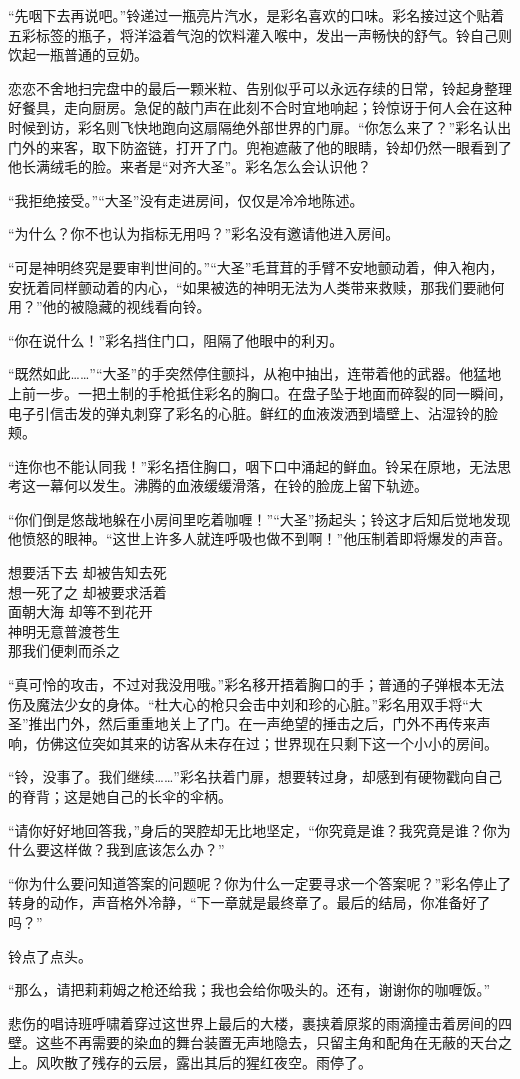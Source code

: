 “先咽下去再说吧。”铃递过一瓶亮片汽水，是彩名喜欢的口味。彩名接过这个贴着五彩标签的瓶子，将洋溢着气泡的饮料灌入喉中，发出一声畅快的舒气。铃自己则饮起一瓶普通的豆奶。

恋恋不舍地扫完盘中的最后一颗米粒、告别似乎可以永远存续的日常，铃起身整理好餐具，走向厨房。急促的敲门声在此刻不合时宜地响起；铃惊讶于何人会在这种时候到访，彩名则飞快地跑向这扇隔绝外部世界的门扉。“你怎么来了？”彩名认出门外的来客，取下防盗链，打开了门。兜袍遮蔽了他的眼睛，铃却仍然一眼看到了他长满绒毛的脸。来者是“对齐大圣”。彩名怎么会认识他？

“我拒绝接受。”“大圣”没有走进房间，仅仅是冷冷地陈述。

“为什么？你不也认为指标无用吗？”彩名没有邀请他进入房间。

“可是神明终究是要审判世间的。”“大圣”毛茸茸的手臂不安地颤动着，伸入袍内，安抚着同样颤动着的内心，“如果被选的神明无法为人类带来救赎，那我们要祂何用？”他的被隐藏的视线看向铃。

“你在说什么！”彩名挡住门口，阻隔了他眼中的利刃。

“既然如此……”“大圣”的手突然停住颤抖，从袍中抽出，连带着他的武器。他猛地上前一步。一把土制的手枪抵住彩名的胸口。在盘子坠于地面而碎裂的同一瞬间，电子引信击发的弹丸刺穿了彩名的心脏。鲜红的血液泼洒到墙壁上、沾湿铃的脸颊。

“连你也不能认同我！”彩名捂住胸口，咽下口中涌起的鲜血。铃呆在原地，无法思考这一幕何以发生。沸腾的血液缓缓滑落，在铃的脸庞上留下轨迹。

“你们倒是悠哉地躲在小房间里吃着咖喱！”“大圣”扬起头；铃这才后知后觉地发现他愤怒的眼神。“这世上许多人就连呼吸也做不到啊！”他压制着即将爆发的声音。
\begin{song}
想要活下去 却被告知去死\\
想一死了之 却被要求活着\\
面朝大海 却等不到花开\\
神明无意普渡苍生\\
那我们便刺而杀之
\end{song}

“真可怜的攻击，不过对我没用哦。”彩名移开捂着胸口的手；普通的子弹根本无法伤及魔法少女的身体。“杜大心的枪只会击中刘和珍的心脏。”彩名用双手将“大圣”推出门外，然后重重地关上了门。在一声绝望的捶击之后，门外不再传来声响，仿佛这位突如其来的访客从未存在过；世界现在只剩下这一个小小的房间。

“铃，没事了。我们继续……”彩名扶着门扉，想要转过身，却感到有硬物戳向自己的脊背；这是她自己的长伞的伞柄。

“请你好好地回答我，”身后的哭腔却无比地坚定，“你究竟是谁？我究竟是谁？你为什么要这样做？我到底该怎么办？”

“你为什么要问知道答案的问题呢？你为什么一定要寻求一个答案呢？”彩名停止了转身的动作，声音格外冷静，“下一章就是最终章了。最后的结局，你准备好了吗？”

铃点了点头。

“那么，请把莉莉姆之枪还给我；我也会给你吸头的。还有，谢谢你的咖喱饭。”

悲伤的唱诗班呼啸着穿过这世界上最后的大楼，裹挟着原浆的雨滴撞击着房间的四壁。这些不再需要的染血的舞台装置无声地隐去，只留主角和配角在无蔽的天台之上。风吹散了残存的云层，露出其后的猩红夜空。雨停了。

